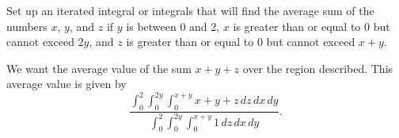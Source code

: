 \begin{activity} \label{A:11.7.7} Set up an iterated integral or integrals that will find the average sum of the numbers $x$, $y$, and $z$ if $y$ is between 0 and 2, $x$ is greater than or equal to 0 but cannot exceed $2y$, and $z$ is greater than or equal to 0 but cannot exceed $x+y$.

\end{activity}
\begin{smallhint}

\end{smallhint}
\begin{bighint}

\end{bighint}
\begin{activitySolution}
We want the average value of the sum $x+y+z$ over the region described. This average value is given by 
\[\frac{\int_0^2 \int_0^{2y} \int_0^{x+y} x+y+z \, dz \, dx \, dy}{\int_0^2 \int_0^{2y} \int_0^{x+y} 1 \, dz \, dx \, dy}.\]
\end{activitySolution}
\aftera
